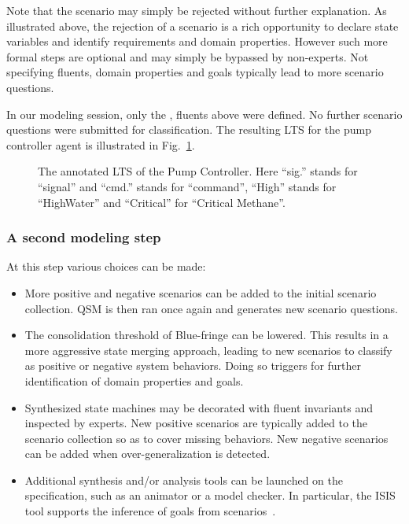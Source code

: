 Note that the scenario may simply be rejected without further explanation. As illustrated above, the rejection of a scenario is a rich opportunity to declare state variables and identify requirements and domain properties. However such more formal steps are optional and may simply be bypassed by non-experts. Not specifying fluents, domain properties and goals typically lead to more scenario questions.

In our modeling session, only the ,  fluents above were defined. No further scenario questions were submitted for classification. The resulting LTS for the pump controller agent is illustrated in Fig.~\ref{image:minepump-controller-1-annotated}.

\begin{figure}
\centering
{}
\caption[The annotated LTS of the Pump Controller]{The annotated LTS of the Pump Controller\label{image:minepump-controller-1-annotated}. Here ``sig.'' stands for ``signal'' and ``cmd.'' stands for ``command'', ``High'' stands for ``HighWater'' and ``Critical'' for ``Critical Methane''.}
\end{figure}

\subsubsection*{A second modeling step}

At this step various choices can be made:
\begin{itemize}
\item More positive and negative scenarios can be added to the initial scenario collection. QSM is then ran once again and generates new scenario questions.
\item The consolidation threshold of Blue-fringe can be lowered. This results in a more aggressive state merging approach, leading to new scenarios to classify as positive or negative system behaviors. Doing so triggers for further identification of domain properties and goals.
\item Synthesized state machines may be decorated with fluent invariants and inspected by experts. New positive scenarios are typically added to the scenario collection so as to cover missing behaviors. New negative scenarios can be added when over-generalization is detected.
\item Additional synthesis and/or analysis tools can be launched on the specification, such as an animator or a model checker. In particular, the ISIS tool supports the inference of goals from scenarios~\cite{Damas:2006, Damas:2011}.
\end{itemize}

